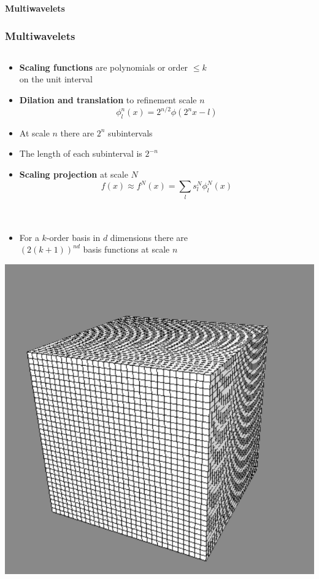 \begin{frame}
    \centering
    \textbf{\Large{Multiwavelets}}
\end{frame}

\begin{frame}
    \frametitle{Multiwavelets}
    \tiny
    \begin{columns}
    \begin{column}[b]{0.55\linewidth}
    \begin{itemize}
        \item   \textbf{Scaling functions} are polynomials or order $\leq k$\\
	        on the unit interval
        \item   \textbf{Dilation and translation} to refinement scale $n$
	        \begin{equation}
		    \nonumber
		    \phi_l^n(x) = 2^{n/2}\phi(2^nx-l)
	        \end{equation}
        \item   At scale $n$ there are $2^n$ subintervals
        \item   The length of each subinterval is $2^{-n}$
        \item   \textbf{Scaling projection} at scale $N$
	        \begin{equation}
		    \nonumber
		    f(x) \approx f^N(x) = \sum_l s_l^N \phi_l^N(x)
	        \end{equation}
	        \ \\
	        \ \\
        \item   For a $k$-order basis in $d$ dimensions there are\\
	        $\left(2(k+1)\right)^{nd}$ basis functions at scale $n$\\
    \end{itemize}
    \centering
    \includegraphics[scale=0.2]{figures/unifgrid.pdf}

\end{column}
\end{columns}
\end{frame}
